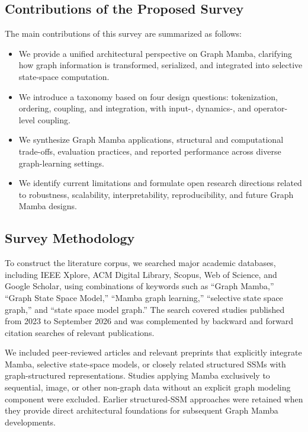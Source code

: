 \documentclass[acmsmall]{acmart}
\begin{document}
\subsection{Contributions of the Proposed Survey}

The main contributions of this survey are summarized as follows:

\begin{itemize}

    \item We provide a unified architectural perspective on Graph Mamba,
    clarifying how graph information is transformed, serialized, and integrated
    into selective state-space computation.

    \item We introduce a taxonomy based on four design questions:
    tokenization, ordering, coupling, and integration, with input-, dynamics-,
    and operator-level coupling.

    \item We synthesize Graph Mamba applications, structural and computational
    trade-offs, evaluation practices, and reported performance across diverse
    graph-learning settings.

    \item We identify current limitations and formulate open research directions
    related to robustness, scalability, interpretability, reproducibility, and
    future Graph Mamba designs.

\end{itemize}

\subsection{Survey Methodology}
\label{subsec:methodology}

To construct the literature corpus, we searched major academic databases,
including IEEE Xplore, ACM Digital Library, Scopus, Web of Science, and Google
Scholar, using combinations of keywords such as ``Graph Mamba,'' ``Graph State
Space Model,'' ``Mamba graph learning,'' ``selective state space graph,'' and
``state space model graph.'' The search covered studies published from 2023 to
September 2026 and was complemented by backward and forward citation searches
of relevant publications.

We included peer-reviewed articles and relevant preprints that explicitly
integrate Mamba, selective state-space models, or closely related structured
SSMs with graph-structured representations. Studies applying Mamba exclusively
to sequential, image, or other non-graph data without an explicit graph
modeling component were excluded. Earlier structured-SSM approaches were
retained when they provide direct architectural foundations for subsequent
Graph Mamba developments.
\end{document}
